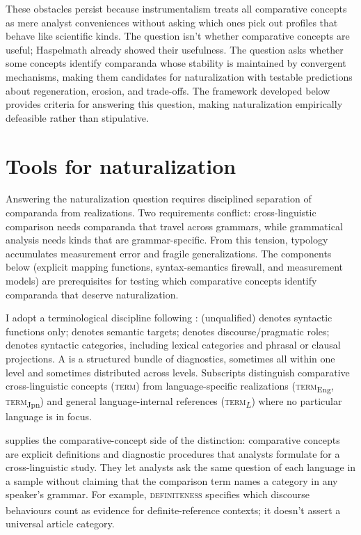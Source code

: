 \documentclass[12pt]{article}
\begin{document}
These obstacles persist because instrumentalism treats all comparative concepts as mere analyst conveniences without asking which ones pick out profiles that behave like scientific kinds. The question isn't whether comparative concepts are useful; Haspelmath already showed their usefulness. The question asks whether some concepts identify comparanda whose stability is maintained by convergent mechanisms, making them candidates for naturalization with testable predictions about regeneration, erosion, and trade-offs. The framework developed below provides criteria for answering this question, making naturalization empirically defeasible rather than stipulative.

\section{Tools for naturalization}\label{sec:tools}

Answering the naturalization question requires disciplined separation of comparanda from realizations. Two requirements conflict: cross-linguistic comparison needs comparanda that travel across grammars, while grammatical analysis needs kinds that are grammar-specific. From this tension, typology accumulates measurement error and fragile generalizations. The components below (explicit mapping functions, syntax-semantics firewall, and measurement models) are prerequisites for testing which comparative concepts identify comparanda that deserve naturalization.

I adopt a terminological discipline following \textcite{HuddlestonPullum2002}:  (unqualified) denotes syntactic functions only;  denotes semantic targets;  denotes discourse/pragmatic roles;  denotes syntactic categories, including lexical categories and phrasal or clausal projections. A  is a structured bundle of diagnostics, sometimes all within one level and sometimes distributed across levels. Subscripts distinguish comparative cross-linguistic concepts (\textsc{term}\textsubscript{\Cross}) from language-specific realizations (\textsc{term}\textsubscript{Eng}, \textsc{term}\textsubscript{Jpn}) and general language-internal references (\textsc{term}\textsubscript{$L$}) where no particular language is in focus.

\textcite{haspelmath2010} supplies the comparative-concept side of the distinction: comparative concepts are explicit definitions and diagnostic procedures that analysts formulate for a cross-linguistic study. They let analysts ask the same question of each language in a sample without claiming that the comparison term names a category in any speaker's grammar. For example, \textsc{definiteness}\textsubscript{\Cross} specifies which discourse behaviours count as evidence for definite-reference contexts; it doesn't assert a universal article category.
\end{document}
